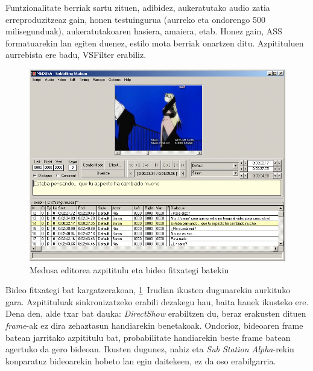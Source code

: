 Funtzionalitate berriak sartu zituen, adibidez, aukeratutako audio zatia erreproduzitzeaz gain, honen testuingurua (aurreko eta ondorengo 500 milisegunduak), aukeratutakoaren hasiera, amaiera, etab. Honez gain, ASS formatuarekin lan egiten duenez, estilo mota berriak onartzen ditu. Azpitituluen aurrebista ere badu, VSFilter erabiliz.
\begin{figure}[htb]
\begin{center}
\includegraphics[width=\columnwidth, natwidth=800pt, natheight=600pt]{Pictures/Chapter2/medusa-bideo.png}
\caption{Medusa editorea azpititulu eta bideo fitxategi batekin}
\label{medusa-bideo}
\end{center}
\end{figure}

Bideo fitxategi bat kargatzerakoan, \ref{medusa-bideo}~Irudian ikusten dugunarekin aurkituko gara. Azpitituluak sinkronizatzeko erabili dezakegu hau, baita hauek ikusteko ere. Dena den, alde txar bat dauka: \textit{DirectShow} erabiltzen du, beraz erakusten dituen \textit{frame}-ak ez dira zehaztasun handiarekin benetakoak. Ondorioz, bideoaren frame batean jarritako azpititulu bat, probabilitate handiarekin beste frame batean agertuko da gero bideoan. Ikusten dugunez, nahiz eta \textit{Sub Station Alpha}-rekin konparatuz bideoarekin hobeto lan egin daitekeen, ez da oso erabilgarria.

